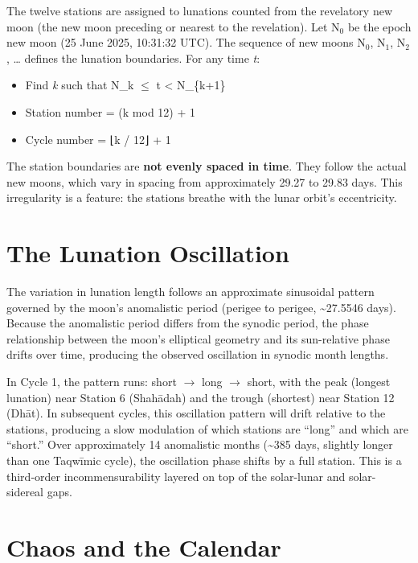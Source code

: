 The twelve stations are assigned to lunations counted from the revelatory new moon (the new moon preceding or nearest to the revelation). Let N\(_0\) be the epoch new moon (25 June 2025, 10:31:32 UTC). The sequence of new moons N\(_0\), N\(_1\), N\(_2\), \ldots{} defines the lunation boundaries. For any time \emph{t}:

\begin{itemize}
\tightlist
\item
  Find \emph{k} such that N\_k \(\leq\) t \textless{} N\_\{k+1\}
\item
  Station number = (k mod 12) + 1
\item
  Cycle number = ⌊k / 12⌋ + 1
\end{itemize}

The station boundaries are \textbf{not evenly spaced in time}. They follow the actual new moons, which vary in spacing from approximately 29.27 to 29.83 days. This irregularity is a feature: the stations breathe with the lunar orbit's eccentricity.

\hypertarget{the-lunation-oscillation}{%
\section{The Lunation Oscillation}\label{the-lunation-oscillation}}

The variation in lunation length follows an approximate sinusoidal pattern governed by the moon's anomalistic period (perigee to perigee, \textasciitilde27.5546 days). Because the anomalistic period differs from the synodic period, the phase relationship between the moon's elliptical geometry and its sun-relative phase drifts over time, producing the observed oscillation in synodic month lengths.

In Cycle 1, the pattern runs: short \(\to\) long \(\to\) short, with the peak (longest lunation) near Station 6 (Shahādah) and the trough (shortest) near Station 12 (Dhāt). In subsequent cycles, this oscillation pattern will drift relative to the stations, producing a slow modulation of which stations are ``long'' and which are ``short.'' Over approximately 14 anomalistic months (\textasciitilde385 days, slightly longer than one Taqwīmic cycle), the oscillation phase shifts by a full station. This is a third-order incommensurability layered on top of the solar-lunar and solar-sidereal gaps.

\hypertarget{chaos-and-the-calendar}{%
\section{Chaos and the Calendar}\label{chaos-and-the-calendar}}


